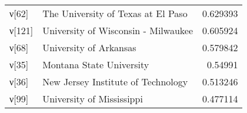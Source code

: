 \begin{tabular}{llr}
 ν[62]  & The University of Texas at El Paso                             &  0.629393 \\
 ν[121] & University of Wisconsin - Milwaukee                            &  0.605924 \\
 ν[68]  & University of Arkansas                                         &  0.579842 \\
 ν[35]  & Montana State University                                       &  0.54991  \\
 ν[36]  & New Jersey Institute of Technology                             &  0.513246 \\
 ν[99]  & University of Mississippi                                      &  0.477114 \\
\hline
\end{tabular}

